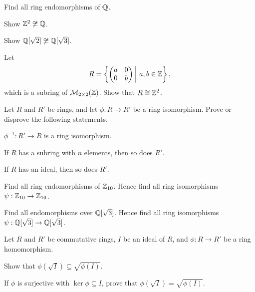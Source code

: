 \begin{problem}
    Find all ring endomorphisms of $\mathbb{Q}$.
\end{problem}

\begin{problem}
    Show $\mathbb{Z}^2 \not\cong \mathbb{Q}$.
\end{problem}

\begin{problem}
    Show $\mathbb{Q}[\sqrt2] \not\cong \mathbb{Q}[\sqrt3]$.
\end{problem}

\begin{problem}
    Let
    \[
        R = \left\{\begin{pmatrix}a&0\\0&b\end{pmatrix}\vert a,b \in \Z\right\},
    \]
    which is a subring of $\mathcal{M}_{2\times2}(\mathbb{Z})$. Show that $R \cong \mathbb{Z}^2$.
\end{problem}

\begin{problem}
    Let $R$ and $R'$ be rings, and let $\phi: R \to R'$ be a ring isomorphism. Prove or disprove the following statements.
    \begin{partquestions}{\alph*}
        \item $\phi^{-1}: R' \to R$ is a ring isomorphism.
        \item If $R$ has a subring with $n$ elements, then so does $R'$.
        \item If $R$ has an ideal, then so does $R'$.
    \end{partquestions}
\end{problem}

\begin{problem}
    Find all ring endomorphisms of $\mathbb{Z}_{10}$.\newline
    Hence find all ring isomorphisms $\psi: \mathbb{Z}_{10} \to \mathbb{Z}_{10}$.
\end{problem}

\begin{problem}
    Find all endomorphisms over $\mathbb{Q}[\sqrt3]$.\newline
    Hence find all ring isomorphisms $\psi: \mathbb{Q}[\sqrt3] \to \mathbb{Q}[\sqrt3]$.
\end{problem}

\begin{problem}
    Let $R$ and $R'$ be commutative rings, $I$ be an ideal of $R$, and $\phi: R\to R'$ be a ring homomorphism.
    \begin{partquestions}{\roman*}
        \item Show that $\phi(\sqrt I) \subseteq \sqrt{\phi(I)}$.
        \item If $\phi$ is surjective with $\ker\phi \subseteq I$, prove that $\phi(\sqrt I) = \sqrt{\phi(I)}$.
    \end{partquestions}
\end{problem}

